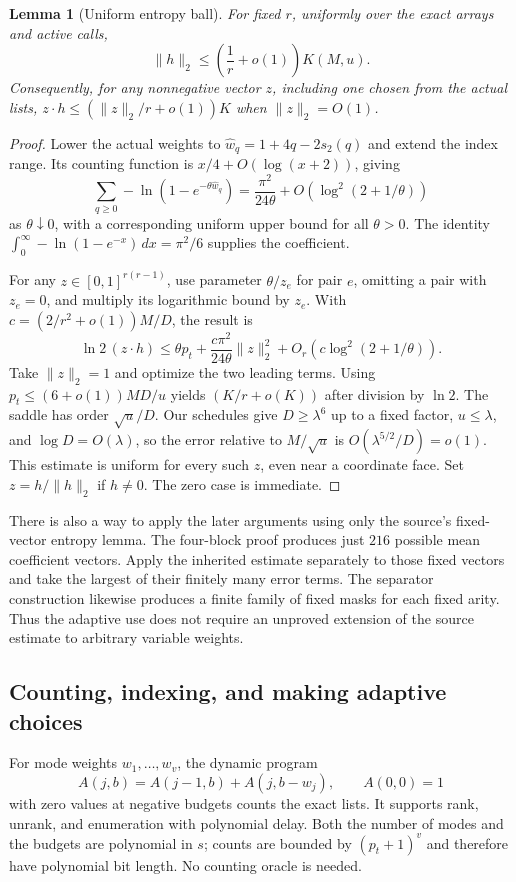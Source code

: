\documentclass[11pt,letterpaper]{article}
\newtheorem{lemma}[theorem]{Lemma}
\theoremstyle{remark}\newtheorem{remark}[theorem]{Remark}
\newcommand{\pc}{s_2}
\begin{document}
\begin{lemma}[Uniform entropy ball]\label{lem:entropy-ball}
For fixed $r$, uniformly over the exact arrays and active calls,
\[
 \|h\|_2\le\left(\frac1r+o(1)\right)K(M,u).
\]
Consequently, for any nonnegative vector $z$, including one chosen from
the actual lists, $z\cdot h\le(\|z\|_2/r+o(1))K$ when $\|z\|_2=O(1)$.
\end{lemma}

\begin{proof}
Lower the actual weights to $\widehat w_q=1+4q-2\pc(q)$ and extend the
index range. Its counting function is $x/4+O(\log(x+2))$, giving
\[
 \sum_{q\ge0}-\ln(1-e^{-\theta\widehat w_q})
 =\frac{\pi^2}{24\theta}+O(\log^2(2+1/\theta))
\]
as $\theta\downarrow0$, with a corresponding uniform upper bound for all
$\theta>0$. The identity
$\int_0^\infty-\ln(1-e^{-x})\,dx=\pi^2/6$ supplies the coefficient.

For any $z\in[0,1]^{r(r-1)}$, use parameter $\theta/z_e$ for pair $e$,
omitting a pair with $z_e=0$, and multiply its logarithmic bound by $z_e$.
With $c=(2/r^2+o(1))M/D$, the result is
\[
 \ln2\,(z\cdot h)\le \theta p_t+
 \frac{c\pi^2}{24\theta}\|z\|_2^2
 +O_r(c\log^2(2+1/\theta)).
\]
Take $\|z\|_2=1$ and optimize the two leading terms. Using
$p_t\le(6+o(1))MD/u$ yields $(K/r+o(K))$ after division by $\ln2$.
The saddle has order $\sqrt u/D$. Our schedules give $D\ge\lambda^6$
up to a fixed factor, $u\le\lambda$, and $\log D=O(\lambda)$, so the
error relative to $M/\sqrt u$ is $O(\lambda^{5/2}/D)=o(1)$.
This estimate is uniform for every such $z$, even near a coordinate face.
Set $z=h/\|h\|_2$ if $h\ne0$. The zero case is immediate.
\end{proof}

There is also a way to apply the later arguments using only the source's
fixed-vector entropy lemma. The four-block proof produces just $216$
possible mean coefficient vectors. Apply the inherited estimate separately
to those fixed vectors and take the largest of their finitely many error
terms. The separator construction likewise produces a finite family of
fixed masks for each fixed arity. Thus the adaptive use does not require
an unproved extension of the source estimate to arbitrary variable weights.

\subsection{Counting, indexing, and making adaptive choices}

For mode weights $w_1,\ldots,w_v$, the dynamic program
\[
 A(j,b)=A(j-1,b)+A(j,b-w_j),\qquad A(0,0)=1
\]
with zero values at negative budgets counts the exact lists. It supports
rank, unrank, and enumeration with polynomial delay. Both the number of
modes and the budgets are polynomial in $s$; counts are bounded by
$(p_t+1)^v$ and therefore have polynomial bit length. No counting oracle
is needed.
\end{document}
